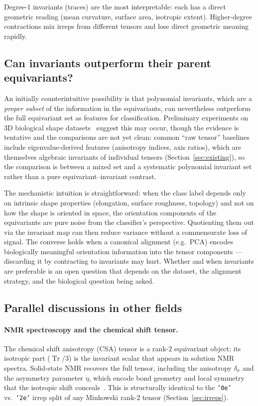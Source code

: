 \documentclass[11pt,a4paper]{article}
\begin{document}
Degree-1 invariants (traces) are the most interpretable: each has a direct
geometric reading (mean curvature, surface area, isotropic extent).
Higher-degree contractions mix irreps from different tensors and lose direct
geometric meaning rapidly.

\subsection*{Can invariants outperform their parent equivariants?}

An initially counterintuitive possibility is that polynomial invariants, which
are a \emph{proper subset} of the information in the equivariants, can nevertheless
outperform the full equivariant set as features for classification.
Preliminary experiments on 3D biological shape datasets~\cite{Yang2023MedMNIST}
suggest this may occur, though the evidence is tentative and the comparisons are
not yet clean: common ``raw tensor'' baselines include eigenvalue-derived features
(anisotropy indices, axis ratios), which are themselves algebraic invariants of
individual tensors (Section~\ref{sec:existing}), so the comparison is between a
mixed set and a systematic polynomial invariant set rather than a pure
equivariant--invariant contrast.

The mechanistic intuition is straightforward: when the class label depends only on
intrinsic shape properties (elongation, surface roughness, topology) and not on
how the shape is oriented in space, the orientation components of the equivariants
are pure noise from the classifier's perspective.
Quotienting them out via the invariant map can then reduce variance without a
commensurate loss of signal.
The converse holds when a canonical alignment (e.g.\ PCA) encodes biologically
meaningful orientation information into the tensor components --- discarding it
by contracting to invariants may hurt.
Whether and when invariants are preferable is an open question that depends on the
dataset, the alignment strategy, and the biological question being asked.

\subsection*{Parallel discussions in other fields}

\paragraph{NMR spectroscopy and the chemical shift tensor.}
The chemical shift anisotropy (CSA) tensor is a rank-2 equivariant object;
its isotropic part ($\operatorname{Tr}/3$) is the invariant scalar that appears
in solution NMR spectra.
Solid-state NMR recovers the full tensor, including the anisotropy $\delta_\sigma$
and the asymmetry parameter $\eta$, which encode bond geometry and local symmetry
that the isotropic shift conceals~\cite{Mehring1983}.
This is structurally identical to the \texttt{'0e'} vs.\ \texttt{'2e'} irrep split
of any Minkowski rank-2 tensor (Section~\ref{sec:irreps}).
\end{document}
